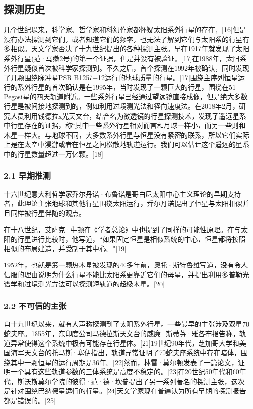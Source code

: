 \subsection{探测历史}
几个世纪以来，科学家、哲学家和科幻作家都怀疑太阳系外行星的存在，[16]但是没有办法探测到它们，或者知道它们的频率，也无法了解到它们与太阳系的行星有多相似。天文学家否决了十九世纪提出的各种探测主张。早在1917年就发现了太阳系外行星(范·马嫩2号)的第一个证据，但是并没有被验证。[17]在1988年，太阳系外行星疑似首次被科学家探测到。不久之后，首个探测在1992年被确认，同时发现了几颗围绕脉冲星PSR B1257+12运行的地球质量的行星。[17]围绕主序列恒星运行的系外行星的首次确认是在1995年，当时发现了一颗巨大的行星，围绕在51 Pegasi星的四天轨道附近。一些系外行星已经通过望远镜直接成像，但是绝大多数行星是被间接地探测到的，例如利用过境测光法和径向速度法。在2018年2月，研究人员利用钱德拉x光天文台，结合名为微透镜的行星探测技术，发现了遥远星系中行星存在的证据，称“其中一些系外行星相对而言和月球一样小，而另一些则和木星一样大。与地球不同，大多数系外行星与恒星没有紧密的联系，所以它们实际上是在太空中漫游或者在恒星之间松散地轨道运行。我们可以估计这个遥远的星系中的行星数量超过一万亿颗。[18]
\subsubsection{2.1 早期推测}
十六世纪意大利哲学家乔尔丹诺·布鲁诺是哥白尼太阳中心主义理论的早期支持者，此理论主张地球和其他行星围绕太阳运行，乔尔丹诺提出了恒星与太阳相似并且同样被行星伴随的观点。

在十八世纪，艾萨克·牛顿在《学者总论》中也提到了同样的可能性原理。在与太阳的行星进行比较时，他写道，“如果固定恒星是相似系统的中心，恒星都将按照相似的布局建造，并受制于其中心。"[19]

1952年，也就是第一颗热木星被发现的40多年前，奥托·斯特鲁维写道，没有令人信服的理由说明为什么行星不能比太阳系更靠近它们的母星，并提出利用多普勒光谱学和过境测光方法可以探测短轨道的超级木星。[20]
\subsubsection{2.2 不可信的主张}
自十九世纪以来，就有人声称探测到了太阳系外行星。一些最早的主张涉及双星70蛇夫座。1855年，东印度公司马德拉斯天文台的威廉·斯蒂芬·雅各布报告称，轨道异常使得这个系统中极有可能存在行星体。[21]19世纪90年代，芝加哥大学和美国海军天文台的托马斯·塞伊指出，轨道异常证明了70蛇夫座系统中存在暗体，围绕其中一颗恒星的运行周期是36年。[22]然而，林雷·莫尔顿发表了一篇论文，证明一个具有这些轨道参数的三体系统是高度不稳定的。[23]在20世纪50年代和60年代，斯沃斯莫尔学院的彼得·范·德·坎普提出了另一系列著名的探测主张，这次是针对围绕巴纳德星运行的行星。[24]天文学家现在普遍认为所有早期的探测报告都是错误的。[25]

